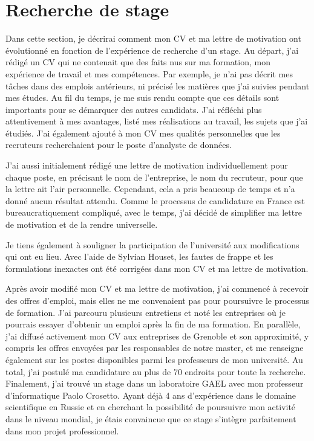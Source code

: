 \documentclass[12pt]{article}
\begin{document}
\section{Recherche de stage}
\label{sec:first}

Dans cette section, je décrirai comment mon CV et ma lettre de
motivation ont évolutionné en fonction de l'expérience de recherche d'un
stage. Au départ, j'ai rédigé un CV qui ne contenait que des faits nus
sur ma formation, mon expérience de travail et mes compétences. Par
exemple, je n'ai pas décrit mes tâches dans des emplois antérieurs, ni
précisé les matières que j'ai suivies pendant mes études. Au fil du
temps, je me suis rendu compte que ces détails sont importants pour se
démarquer des autres candidats. J'ai réfléchi plus attentivement à mes
avantages, listé mes réalisations au travail, les sujets que j'ai
étudiés. J'ai également ajouté à mon CV mes qualités personnelles que
les recruteurs recherchaient pour le poste d'analyste de données.

J'ai aussi initialement rédigé une lettre de motivation individuellement
pour chaque poste, en précisant le nom de l'entreprise, le nom du
recruteur, pour que la lettre ait l'air personnelle. Cependant, cela a
pris beaucoup de temps et n'a donné aucun résultat attendu. Comme le
processus de candidature en France est bureaucratiquement compliqué,
avec le temps, j'ai décidé de simplifier ma lettre de motivation et de
la rendre universelle.

Je tiens également à souligner la participation de l'université aux
modifications qui ont eu lieu. Avec l'aide de Sylvian Houset, les fautes
de frappe et les formulations inexactes ont été corrigées dans mon CV et
ma lettre de motivation.

Après avoir modifié mon CV et ma lettre de motivation, j'ai commencé à
recevoir des offres d'emploi, mais elles ne me convenaient pas pour
poursuivre le processus de formation. J'ai parcouru plusieurs entretiens
et noté les entreprises où je pourrais essayer d'obtenir un emploi après
la fin de ma formation. En parallèle, j'ai diffusé activement mon CV aux
entreprises de Grenoble et son approximité, y compris les offres
envoyées par les responsables de notre master, et me renseigne également
sur les postes disponibles parmi les professeurs de mon université. Au
total, j'ai postulé ma candidature au plus de 70 endroits pour toute la
recherche. Finalement, j'ai trouvé un stage dans un laboratoire GAEL
avec mon professeur d'informatique Paolo Crosetto. Ayant déjà 4 ans
d'expérience dans le domaine scientifique en Russie et en cherchant la
possibilité de poursuivre mon activité dans le niveau mondial, je étais
convaincue que ce stage s'intègre parfaitement dans mon projet
professionnel.
\end{document}
